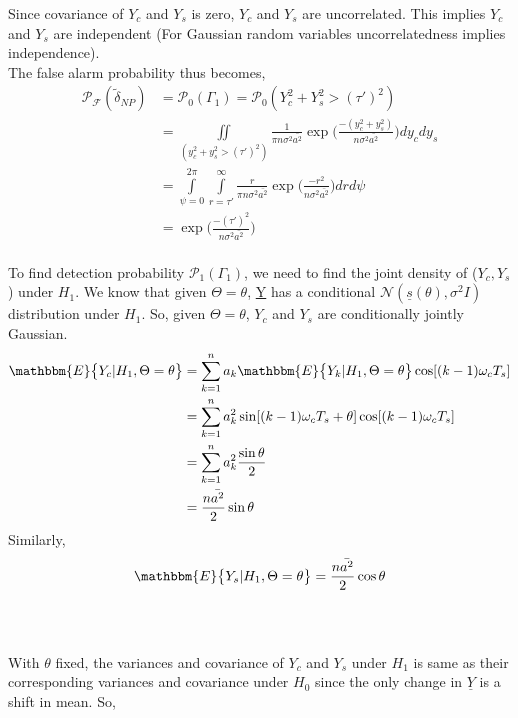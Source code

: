 \documentclass[a4paper,english,12pt]{article}
\begin{document}
\par Since covariance of $Y_c$ and $Y_s$ is zero, $Y_c$ and $Y_s$ are uncorrelated. This implies $Y_c$ and $Y_s$ 
are independent (For Gaussian random variables uncorrelatedness implies independence).\\
The false alarm probability thus becomes,
\begin{equation*}
\begin{aligned}
\mathcal{P_F}(\tilde{\delta}_{NP}) &=\mathcal{P}_0(\Gamma_1)   
= \mathcal{P}_0(Y_c^2+Y_s^2>(\tau')^2) \\
&=\iint \limits_{(y_c^2+y_s^2>(\tau')^2)}^{} \frac{1}{\pi n\sigma^2\bar{a^2}}  \exp\bigg(\frac{ -(y_c^2+y_s^2)}{n\sigma^2\bar{a^2}}\bigg)dy_c dy_s \\
&=\int \limits_{\psi=0}^{2\pi}\int \limits_{r=\tau'}^{\infty}\frac{r}{\pi n\sigma^2\bar{a^2}}   \exp\bigg(\frac{ -r^2}{n\sigma^2\bar{a^2}}\bigg)dr d\psi  \\
&=\exp\bigg(\frac{-(\tau')^2}{n\sigma^2\bar{a^2}}\bigg)  \\
\end{aligned}
\end{equation*}
\par To find detection probability $\mathcal{P}_1(\Gamma_1)$, we need to find the joint density of ($Y_c,Y_s$) under $H_1$. We know that given $\Theta=\theta$, \underline{Y} has a conditional $\mathcal{N}(\underline{s}(\theta),\sigma^2I)$ distribution under $H_1$. So, given $\Theta=\theta$, $Y_c$ and $Y_s$ are conditionally jointly Gaussian.     
\begin{equation*}
\begin{aligned}
\mathbbm{E}\big\{Y_c|H_1, \Theta=\theta\big\} &= \sum_{k=1}^{n}a_k\mathbbm{E}\big\{Y_k|H_1, \Theta=\theta\big\}\cos[(k-1)\omega_c T_s] \\
&=\sum_{k=1}^{n}a_k^2 \sin[(k-1)\omega_c T_s+\theta]\cos[(k-1)\omega_c T_s] \\
&=\sum_{k=1}^{n}a_k^2 \frac{\sin\theta}{2} \\
&=\frac{n\bar{a^2}}{2}\sin\theta
\end{aligned}
\end{equation*}
Similarly, 
\begin{equation*}
\mathbbm{E}\big\{Y_s|H_1, \Theta=\theta\big\}=
\frac{n\bar{a^2}}{2}\cos\theta
\end{equation*} \\ \\
\par With $\theta$ fixed, the variances and covariance of $Y_c$ and $Y_s$ under $H_1$ is same as their corresponding variances and covariance under $H_0$ since the only change in $\underline{Y}$ is a shift in mean. So,
\end{document}
